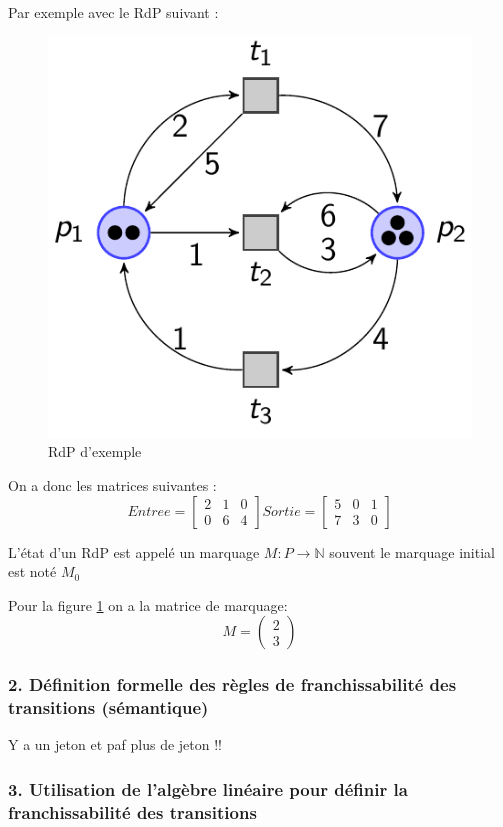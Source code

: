 \documentclass[12pt,a4paper,oneside]{article}
\begin{document}
		Par exemple avec le RdP suivant :

		\begin{figure}[h]
			\includegraphics[scale = 0.5]{./img/exrdp.png}
			\centering
			\caption{RdP d'exemple}
			\label{exrdp}
		\end{figure}

		On a donc les matrices suivantes :
		$$Entree = \begin{bmatrix}
			2 & 1 & 0 \\
			0 & 6 & 4
		\end{bmatrix}
		Sortie = \begin{bmatrix}
			5 & 0 & 1 \\
			7 & 3 & 0
		\end{bmatrix}$$

		L'état d'un RdP est appelé un marquage $M:P\to \mathbb{N}$ souvent le marquage initial est noté $M_0$

		Pour la figure \ref{exrdp} on a la matrice de marquage:
		$$M = \begin{pmatrix}
			2\\
			3
		\end{pmatrix}$$
	\subsubsection*{2. Définition formelle des règles de franchissabilité des transitions (sémantique)}
		Y a un jeton et paf plus de jeton !!

	\subsubsection*{3. Utilisation de l'algèbre linéaire pour définir la franchissabilité des transitions}
\end{document}

